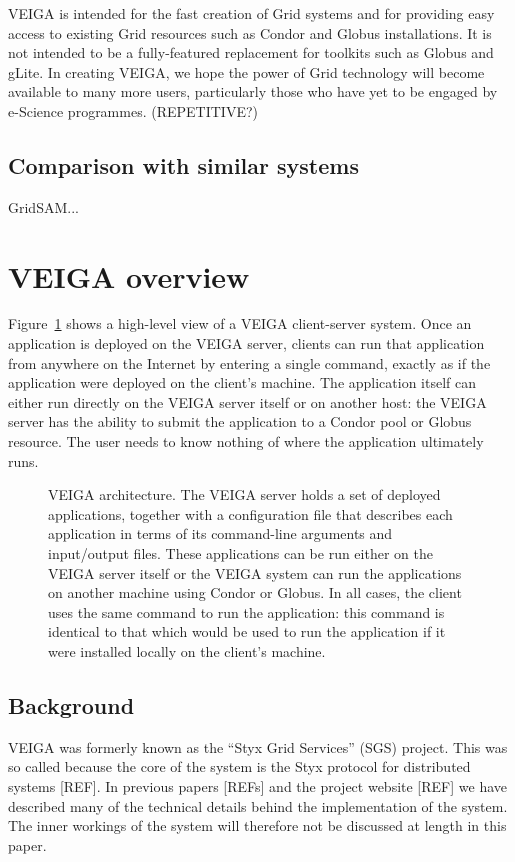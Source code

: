 \documentclass[a4paper]{article}
\begin{document}
\begin{multicols}{2}
VEIGA is intended for the fast creation of Grid systems and for providing easy access to existing Grid resources such as Condor and Globus installations.  It is not intended to be a fully-featured replacement for toolkits such as Globus and gLite.  In creating VEIGA, we hope the power of Grid technology will become available to many more users, particularly those who have yet to be engaged by e-Science programmes.  (REPETITIVE?)

\subsection{Comparison with similar systems}
GridSAM... 

\section{VEIGA overview}
Figure~\ref{fig:veigaarchitecture} shows a high-level view of a VEIGA client-server system.  Once an application is deployed on the VEIGA server, clients can run that application from anywhere on the Internet by entering a single command, exactly as if the application were deployed on the client's machine.  The application itself can either run directly on the VEIGA server itself or on another host: the VEIGA server has the ability to submit the application to a Condor pool or Globus resource.  The user needs to know nothing of where the application ultimately runs.

\begin{figure}
\centering
\caption{VEIGA architecture.  The VEIGA server holds a set of deployed applications, together with a configuration file that describes each application in terms of its command-line arguments and input/output files.  These applications can be run either on the VEIGA server itself or the VEIGA system can run the applications on another machine using Condor or Globus.  In all cases, the client uses the same command to run the application: this command is identical to that which would be used to run the application if it were installed locally on the client's machine.}
\label{fig:veigaarchitecture}
\end{figure}

\subsection{Background}
VEIGA was formerly known as the ``Styx Grid Services'' (SGS) project.  This was so called because the core of the system is the Styx protocol for distributed systems [REF].  In previous papers [REFs] and the project website [REF] we have described many of the technical details behind the implementation of the system.  The inner workings of the system will therefore not be discussed at length in this paper.


\end{multicols}
\end{document}
